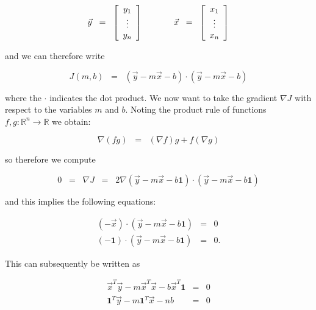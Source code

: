 \documentclass{article}
\begin{document}
\begin{equation*}
\vec{y} \;\; =\;\; \left [ \begin{array}{c}
y_1\\
\vdots \\
y_n\\
\end{array} \right ] \hspace{3pc} \vec{x} \;\; =\;\; \left [ \begin{array}{c}
x_1\\
\vdots \\
x_n\\
\end{array} \right ]
\end{equation*}

\noindent and we can therefore write 

\begin{equation*}
J(m,b) \;\; =\;\; (\vec{y} - m\vec{x} -b) \cdot (\vec{y} - m \vec{x} - b)
\end{equation*}

\noindent where the $\cdot$ indicates the dot product.  We now want to take the gradient $\nabla J$ with respect to the variables $m$ and $b$.  Noting the product rule of functions $f,g:\mathbb{R}^n \to \mathbb{R}$ we obtain:

\begin{equation*}
\nabla (fg) \;\; =\;\; (\nabla f) g + f(\nabla g)
\end{equation*}

\noindent so therefore we compute

\begin{equation*}
0 \;\; =\;\; \nabla J \;\; =\;\; 2 \nabla(\vec{y} - m \vec{x} - b \textbf{1}) \cdot (\vec{y} - m\vec{x} - b\textbf{1})
\end{equation*}

\noindent and this implies the following equations:

\begin{eqnarray*}
(-\vec{x})\cdot (\vec{y} - m\vec{x} - b\textbf{1}) & = & 0 \\
(-\textbf{1}) \cdot (\vec{y} - m \vec{x} - b \textbf{1}) & = & 0.
\end{eqnarray*}

\noindent This can subsequently be written as 

\begin{eqnarray*}
\vec{x}^T\vec{y} - m \vec{x}^T\vec{x} - b\vec{x}^T \textbf{1} & = & 0 \\
\textbf{1}^T\vec{y} - m \textbf{1}^T\vec{x} - nb & = & 0 
\end{eqnarray*}
\end{document}
